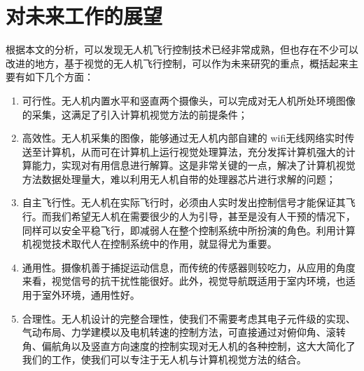 \section{对未来工作的展望}
根据本文的分析，可以发现无人机飞行控制技术已经非常成熟，但也存在不少可以改进的地方，基于视觉的无人机飞行控制，可以作为未来研究的重点，概括起来主要有如下几个方面：
%
\begin{enumerate}
\item 可行性。无人机内置水平和竖直两个摄像头，可以完成对无人机所处环境图像的采集，这满足了引入计算机视觉方法的前提条件；
\item 高效性。无人机采集的图像，能够通过无人机内部自建的 wifi无线网络实时传送至计算机，从而可在计算机上运行视觉处理算法，充分发挥计算机强大的计算能力，实现对有用信息进行解算。这是非常关键的一点，解决了计算机视觉方法数据处理量大，难以利用无人机自带的处理器芯片进行求解的问题；
\item 自主飞行性。无人机在实际飞行时，必须由人实时发出控制信号才能保证其飞行。而我们希望无人机在需要很少的人为引导，甚至是没有人干预的情况下，同样可以安全平稳飞行，即减弱人在整个控制系统中所扮演的角色。利用计算机视觉技术取代人在控制系统中的作用，就显得尤为重要。
\item 通用性。摄像机善于捕捉运动信息，而传统的传感器则较吃力，从应用的角度来看，视觉信号的抗干扰性能很好。此外，视觉导航既适用于室内环境，也适用于室外环境，通用性好。
\item 合理性。无人机设计的完整合理性，使我们不需要考虑其电子元件级的实现、气动布局、力学建模以及电机转速的控制方法，可直接通过对俯仰角、滚转角、偏航角以及竖直方向速度的控制实现对无人机的各种控制，这大大简化了我们的工作，使我们可以专注于无人机与计算机视觉方法的结合。

\end{enumerate}

